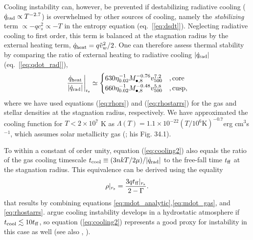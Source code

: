 \documentclass[usenatbib,fleqn]{mn2e}
\newcommand{\tff}{t_{\rm ff}}
\begin{document}
Cooling instability can, however, be prevented if destabilizing
radiative cooling ($\dot{q}_{\rm rad} \propto T^{-2.7}$) is
overwhelmed by other sources of cooling, namely the {\it stabilizing}
term $\propto -q c_{s}^{2} \propto -T$ in the entropy equation
(eq.~[\ref{eq:dsdt}]).  Neglecting radiative cooling to first order,
this term is balanced at the stagnation radius by the external heating
term, $\dot{q}_{\rm heat} = q \tilde{v}_{w}^{2}/2$.  One can therefore assess thermal
stability by comparing the ratio of
external heating to radiative cooling $|\dot{q}_{\rm rad}|$
(eq.~[\ref{eq:qdot_rad}]),
\begin{align}
\left.\frac{\dot{q}_{\rm heat}}{|\dot{q}_{\rm rad}|}\right|_{\rm r_{\rm s}} \simeq
  \begin{cases}
   630 \eta_{0.02}^{-1} M_{\bullet,8}^{-0.76}v_{500}^{7.2}  &, \text{core}\\
   660 \eta_{0.02}^{-1} M_{\bullet,8}^{-0.48}v_{500}^{5.8}  &, \text{cusp},     
  \end{cases}
  \label{eq:cooling2}
\end{align}
where we have used equations (\ref{eq:rhors}) and (\ref{eq:rhostarrs})
for the gas and stellar densities at the stagnation radius,
respectively.  We have approximated the cooling function for $T <
2\times 10^{7}$ K as $\Lambda(T) = 1.1 \times 10^{-22} \left(T/10^6
  \text{K}\right)^{-0.7} $erg cm$^3 $s$^{-1}$, which assumes solar
metallicity gas (\citealt{Draine:2011a}; his Fig. 34.1).  


To within a constant of order unity, equation (\ref{eq:cooling2}) also
equals the ratio of the gas cooling timescale $t_{\rm cool} \equiv (3n
kT/2 \mu)/|\dot{q}_{\rm rad}|$ to the free-fall time $t_{\rm ff}$ at the
stagnation radius.  This equivalence can be derived using the equality
\begin{align}
\rho|_{r_{\rm s}}=\frac{3 q\tff|_{r_{\rm s}}}{2-\Gamma}.
\label{eq:rhors2}
\end{align}
that results by combining equations
\eqref{eq:mdot_analytic},\eqref{eq:mdot_gas}, and
\eqref{eq:rhostarrs}.  \citet{McCourt+12} argue cooling instability
develops in a hydrostatic atmosphere if $t_{\rm cool} \lesssim 10 t_{\rm ff}$,
so equation (\ref{eq:cooling2}) represents a good proxy for
instability in this case as well (see also \citealt{Li&Bryan14a}, \citealt{Li&Bryan14b}).
\end{document}
